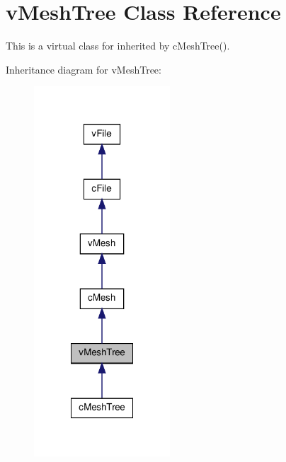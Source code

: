 \hypertarget{classv_mesh_tree}{
\section{vMeshTree Class Reference}
\label{classv_mesh_tree}
}


This is a virtual class for inherited by cMeshTree().  




Inheritance diagram for vMeshTree:
\nopagebreak
\begin{figure}[H]
\begin{center}
\leavevmode
\includegraphics[width=144pt]{classv_mesh_tree__inherit__graph}
\end{center}
\end{figure}


